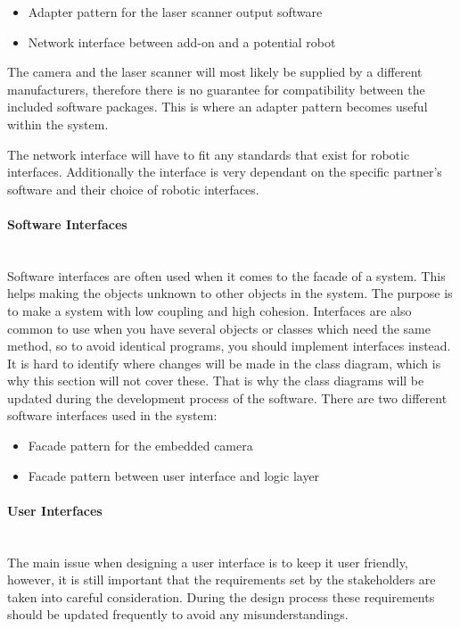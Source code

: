 \begin{itemize}

\item Adapter pattern for the laser scanner output software
\item Network interface between add-on and a potential robot

\end{itemize}

The camera and the laser scanner will most likely be supplied by a different manufacturers, therefore there is no guarantee for compatibility between the included software packages. This is where an adapter pattern becomes useful within the system.

The network interface will have to fit any standards that exist for robotic interfaces. Additionally the interface is very dependant on the specific partner's software and their choice of robotic interfaces.
\paragraph*{Software Interfaces}~\\
Software interfaces are often used when it comes to the facade of a system. This helps making the objects unknown to other objects in the system. The purpose is to make a system with low coupling and high cohesion. Interfaces are also common to use when you have several objects or classes which need the same method, so to avoid identical programs, you should implement interfaces instead. 
It is hard to identify where changes will be made in the class diagram, which is why this section will not cover these. 
That is why the class diagrams will be updated during the development process of the software. There are two different software interfaces used in the system:
\begin{itemize}

\item Facade pattern for the embedded camera
\item Facade pattern between user interface and logic layer

\end{itemize}

\paragraph*{User Interfaces}~\\
The main issue when designing a user interface is to keep it user friendly, however, it is still important that the requirements set by the stakeholders are taken into careful consideration. During the design process these requirements should be updated frequently to avoid any misunderstandings.

